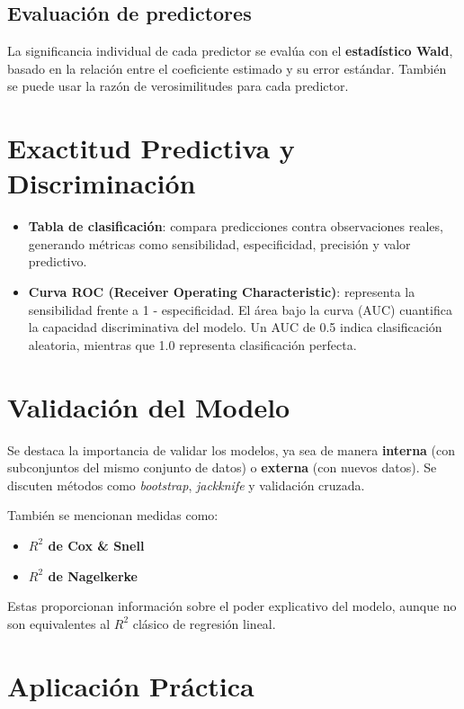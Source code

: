 \documentclass[12pt]{article}
\begin{document}
\subsection*{Evaluaci\'on de predictores}
La significancia individual de cada predictor se eval\'ua con el \textbf{estad\'istico Wald}, basado en la relaci\'on entre el coeficiente estimado y su error est\'andar. Tambi\'en se puede usar la raz\'on de verosimilitudes para cada predictor.

\section*{Exactitud Predictiva y Discriminaci\'on}

\begin{itemize}
  \item \textbf{Tabla de clasificaci\'on}: compara predicciones contra observaciones reales, generando m\'etricas como sensibilidad, especificidad, precisi\'on y valor predictivo.
  \item \textbf{Curva ROC (Receiver Operating Characteristic)}: representa la sensibilidad frente a 1 - especificidad. El \'area bajo la curva (AUC) cuantifica la capacidad discriminativa del modelo. Un AUC de 0.5 indica clasificaci\'on aleatoria, mientras que 1.0 representa clasificaci\'on perfecta.
\end{itemize}

\section*{Validaci\'on del Modelo}

Se destaca la importancia de validar los modelos, ya sea de manera \textbf{interna} (con subconjuntos del mismo conjunto de datos) o \textbf{externa} (con nuevos datos). Se discuten m\'etodos como \textit{bootstrap}, \textit{jackknife} y validaci\'on cruzada.

Tambi\'en se mencionan medidas como:
\begin{itemize}
  \item \textbf{$R^2$ de Cox \& Snell}
  \item \textbf{$R^2$ de Nagelkerke}
\end{itemize}
Estas proporcionan informaci\'on sobre el poder explicativo del modelo, aunque no son equivalentes al $R^2$ cl\'asico de regresi\'on lineal.

\section*{Aplicaci\'on Pr\'actica}
\end{document}

